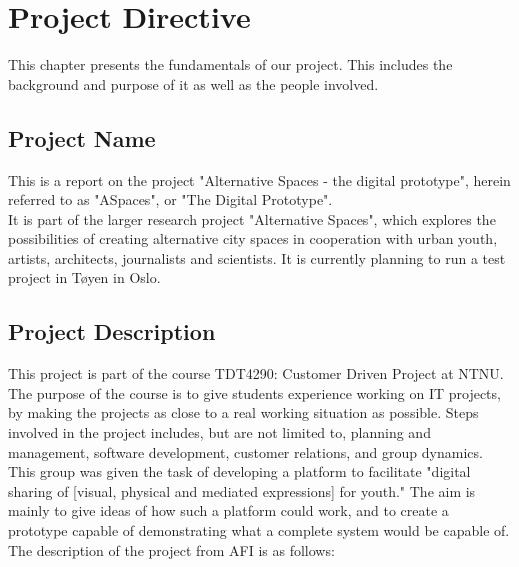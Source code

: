 \chapter{Project Directive}
\label{chap:Intro}
This chapter presents the fundamentals of our project. This includes the background and purpose of it as well as the people involved.

\section{Project Name}
\label{sec:IntroProjName}
This is a report on the project "Alternative Spaces - the digital prototype", herein referred to as "ASpaces", or "The Digital Prototype". \\
It is part of the larger research project "Alternative Spaces", which explores the possibilities of creating alternative city spaces in cooperation with urban youth, artists, architects, journalists and scientists. It is currently planning to run a test project in Tøyen in Oslo.

\section{Project Description}
\label{sec:IntroProjectDescr}
This project is part of the course TDT4290: Customer Driven Project at NTNU. The purpose of the course is to give students experience working on IT projects, by making the projects as close to a real working situation as possible. Steps involved in the project includes, but are not limited to, planning and management, software development, customer relations, and group dynamics. \\
This group was given the task of developing a platform to facilitate "digital sharing of [visual, physical and mediated expressions] for youth." The aim is mainly to give ideas of how such a platform could work, and to create a prototype capable of demonstrating what a complete system would be capable of. \\
The description of the project from AFI is as follows:

